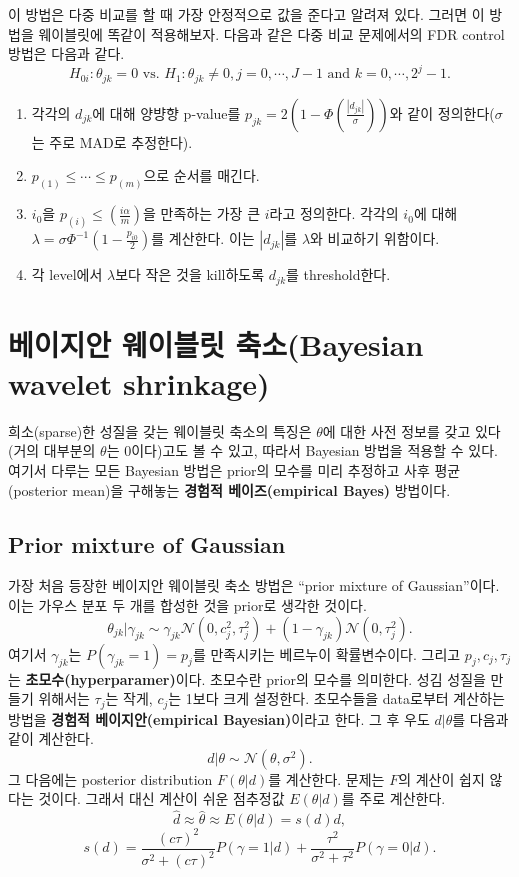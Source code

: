 \documentclass[b5paper,]{scrbook}
\theoremstyle{plain}
\theoremstyle{definition}
\numberwithin{equation}{section}
\begin{document}
이 방법은 다중 비교를 할 때 가장 안정적으로 값을 준다고 알려져 있다. 그러면 이 방법을 웨이블릿에 똑같이 적용해보자. 다음과 같은 다중 비교 문제에서의 FDR control 방법은 다음과 같다.
\[H_{0i}:\theta_{jk}=0 \text{ vs. } H_{1}:\theta_{jk} \neq 0, j=0,\cdots, J-1 \text{ and } k=0, \cdots, 2^{j}-1.\]

\begin{enumerate}
\def\labelenumi{\arabic{enumi}.}
\item
  각각의 \(d_{jk}\)에 대해 양뱡향 p-value를 \(p_{jk}=2(1-\Phi (\frac{| d_{jk}|}{\sigma}))\)와 같이 정의한다(\(\sigma\)는 주로 MAD로 추정한다).
\item
  \(p_{(1)} \leq \cdots \leq p_{(m)}\)으로 순서를 매긴다.
\item
  \(i_{0}\)을 \(p_{(i)} \leq (\frac{i\alpha}{m})\)을 만족하는 가장 큰 \(i\)라고 정의한다. 각각의 \(i_{0}\)에 대해 \(\lambda = \sigma \Phi^{-1}(1-\frac{p_{i0}}{2})\)를 계산한다. 이는 \(|d_{jk}|\)를 \(\lambda\)와 비교하기 위함이다.
\item
  각 level에서 \(\lambda\)보다 작은 것을 kill하도록 \(d_{jk}\)를 threshold한다.
\end{enumerate}

\hypertarget{--bayesian-wavelet-shrinkage}{%
\section{베이지안 웨이블릿 축소(Bayesian wavelet shrinkage)}\label{--bayesian-wavelet-shrinkage}}

희소(sparse)한 성질을 갖는 웨이블릿 축소의 특징은 \(\theta\)에 대한 사전 정보를 갖고 있다(거의 대부분의 \(\theta\)는 0이다)고도 볼 수 있고, 따라서 Bayesian 방법을 적용할 수 있다. 여기서 다루는 모든 Bayesian 방법은 prior의 모수를 미리 추정하고 사후 평균(posterior mean)을 구해놓는 \textbf{경험적 베이즈(empirical Bayes)} 방법이다.

\hypertarget{prior-mixture-of-gaussian}{%
\subsection{Prior mixture of Gaussian}\label{prior-mixture-of-gaussian}}

가장 처음 등장한 베이지안 웨이블릿 축소 방법은 ``prior mixture of Gaussian''이다. 이는 가우스 분포 두 개를 합성한 것을 prior로 생각한 것이다.
\[\theta_{jk}|\gamma_{jk} \sim \gamma_{jk} \mathcal{N}(0,c_{j}^{2}, \tau_{j}^{2})+(1-\gamma_{jk}) \mathcal{N}(0,\tau_{j}^{2}).\]
여기서 \(\gamma_{jk}\)는 \(P(\gamma_{jk}=1)=p_{j}\)를 만족시키는 베르누이 확률변수이다. 그리고 \(p_{j},c_{j},\tau_{j}\)는 \textbf{초모수(hyperparamer)}이다. 초모수란 prior의 모수를 의미한다. 성김 성질을 만들기 위해서는 \(\tau_{j}\)는 작게, \(c_{j}\)는 1보다 크게 설정한다. 초모수들을 data로부터 계산하는 방법을 \textbf{경험적 베이지안(empirical Bayesian)}이라고 한다. 그 후 우도 \(d|\theta\)를 다음과 같이 계산한다.
\[d|\theta \sim \mathcal{N}(\theta, \sigma^{2}).\]
그 다음에는 posterior distribution \(F(\theta | d)\)를 계산한다. 문제는 \(F\)의 계산이 쉽지 않다는 것이다. 그래서 대신 계산이 쉬운 점추정값 \(E(\theta | d)\)를 주로 계산한다.
\[\hat{d}\approx \hat{\theta} \approx E(\theta | d)=s(d)d,\]
\[s(d)=\frac{(c\tau)^{2}}{\sigma^{2}+(c\tau)^{2}}P(\gamma=1 | d)+\frac{\tau^{2}}{\sigma^{2}+\tau^{2}}P(\gamma=0 | d).\]
\end{document}
